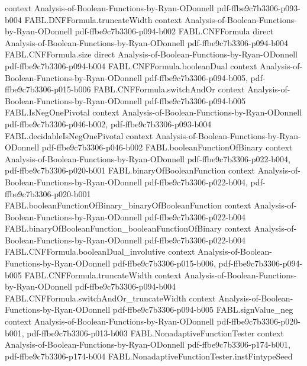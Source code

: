 \begin{theorem}
  {context}
  {Analysis-of-Boolean-Functions-by-Ryan-ODonnell}
  {pdf-ffbe9c7b3306-p093-b004}
\proofstep
  {FABL.DNFFormula.truncateWidth}
  {context}
  {Analysis-of-Boolean-Functions-by-Ryan-ODonnell}
  {pdf-ffbe9c7b3306-p094-b002}
\proofstep
  {FABL.CNFFormula}
  {direct}
  {Analysis-of-Boolean-Functions-by-Ryan-ODonnell}
  {pdf-ffbe9c7b3306-p094-b004}
\proofstep
  {FABL.CNFFormula.size}
  {direct}
  {Analysis-of-Boolean-Functions-by-Ryan-ODonnell}
  {pdf-ffbe9c7b3306-p094-b004}
\proofstep
  {FABL.CNFFormula.booleanDual}
  {context}
  {Analysis-of-Boolean-Functions-by-Ryan-ODonnell}
  {pdf-ffbe9c7b3306-p094-b005,
    pdf-ffbe9c7b3306-p015-b006}
\proofstep
  {FABL.CNFFormula.switchAndOr}
  {context}
  {Analysis-of-Boolean-Functions-by-Ryan-ODonnell}
  {pdf-ffbe9c7b3306-p094-b005}
\proofstep
  {FABL.IsNegOnePivotal}
  {context}
  {Analysis-of-Boolean-Functions-by-Ryan-ODonnell}
  {pdf-ffbe9c7b3306-p046-b002,
    pdf-ffbe9c7b3306-p093-b004}
\proofstep
  {FABL.decidableIsNegOnePivotal}
  {context}
  {Analysis-of-Boolean-Functions-by-Ryan-ODonnell}
  {pdf-ffbe9c7b3306-p046-b002}
\proofstep
  {FABL.booleanFunctionOfBinary}
  {context}
  {Analysis-of-Boolean-Functions-by-Ryan-ODonnell}
  {pdf-ffbe9c7b3306-p022-b004,
    pdf-ffbe9c7b3306-p020-b001}
\proofstep
  {FABL.binaryOfBooleanFunction}
  {context}
  {Analysis-of-Boolean-Functions-by-Ryan-ODonnell}
  {pdf-ffbe9c7b3306-p022-b004,
    pdf-ffbe9c7b3306-p020-b001}
\proofstep
  {FABL.booleanFunctionOfBinary_binaryOfBooleanFunction}
  {context}
  {Analysis-of-Boolean-Functions-by-Ryan-ODonnell}
  {pdf-ffbe9c7b3306-p022-b004}
\proofstep
  {FABL.binaryOfBooleanFunction_booleanFunctionOfBinary}
  {context}
  {Analysis-of-Boolean-Functions-by-Ryan-ODonnell}
  {pdf-ffbe9c7b3306-p022-b004}
\proofstep
  {FABL.CNFFormula.booleanDual_involutive}
  {context}
  {Analysis-of-Boolean-Functions-by-Ryan-ODonnell}
  {pdf-ffbe9c7b3306-p015-b006,
    pdf-ffbe9c7b3306-p094-b005}
\proofstep
  {FABL.CNFFormula.truncateWidth}
  {context}
  {Analysis-of-Boolean-Functions-by-Ryan-ODonnell}
  {pdf-ffbe9c7b3306-p094-b004}
\proofstep
  {FABL.CNFFormula.switchAndOr_truncateWidth}
  {context}
  {Analysis-of-Boolean-Functions-by-Ryan-ODonnell}
  {pdf-ffbe9c7b3306-p094-b005}
\proofstep
  {FABL.signValue_neg}
  {context}
  {Analysis-of-Boolean-Functions-by-Ryan-ODonnell}
  {pdf-ffbe9c7b3306-p020-b001,
    pdf-ffbe9c7b3306-p013-b003}
\proofstep
  {FABL.NonadaptiveFunctionTester}
  {context}
  {Analysis-of-Boolean-Functions-by-Ryan-ODonnell}
  {pdf-ffbe9c7b3306-p174-b001,
    pdf-ffbe9c7b3306-p174-b004}
\proofstep
  {FABL.NonadaptiveFunctionTester.instFintypeSeed}

\end{theorem}
